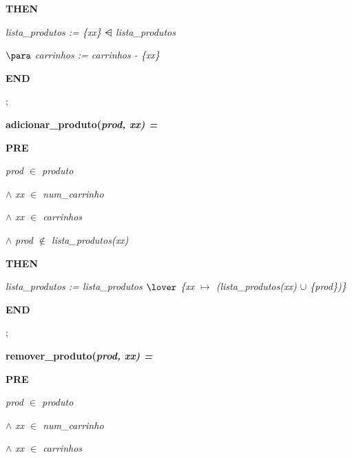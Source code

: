 \documentclass[11pt]{article}
\begin{document}
\begin{sloppypar}
\hspace*{0.20in}\bf THEN

\hspace*{0.40in}\it lista\_produtos \rm := \rm \{\it xx\rm \}  $\ndres$  \it lista\_produtos

\hspace*{0.40in} $\para$  \it carrinhos \rm := \it carrinhos \rm - \rm \{\it xx\rm \}

\hspace*{0.20in}\bf END

\hspace*{0.20in}\rm ;

\hspace*{0.20in}\bf adicionar\_produto\rm (\it prod\rm , \it xx\rm ) \rm = 

\hspace*{0.20in}\bf PRE

\hspace*{0.40in}\it prod  $\in$  \it produto

\hspace*{0.40in} $\land$  \it xx  $\in$  \it num\_carrinho

\hspace*{0.40in} $\land$  \it xx $\in$  \it carrinhos

\hspace*{0.40in} $\land$  \it prod  $\not\in$  \it lista\_produtos\rm (\it xx\rm )

\hspace*{0.20in}\bf THEN

\hspace*{0.40in}\it lista\_produtos \rm := \it lista\_produtos  $\lover$  \rm \{\it xx  $\mapsto$  \rm (\it lista\_produtos\rm (\it xx\rm )  $\cup$  \rm \{\it prod\rm \}\rm )\rm \}

\hspace*{0.20in}\bf END

\hspace*{0.20in}\rm ;

\hspace*{0.20in}\bf remover\_produto\rm (\it prod\rm , \it xx\rm ) \rm =

\hspace*{0.20in}\bf PRE

\hspace*{0.40in}\it prod $\in$  \it produto

\hspace*{0.40in} $\land$  \it xx $\in$  \it num\_carrinho

\hspace*{0.40in} $\land$  \it xx $\in$  \it carrinhos


\end{sloppypar}
\end{document}
